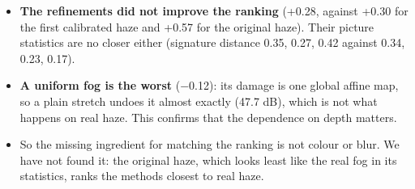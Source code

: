 \documentclass[10pt,a4paper]{article}
\begin{document}
\begin{itemize}
\item \textbf{The refinements did not improve the ranking} (+0.28, against +0.30 for the first calibrated haze and +0.57 for the original haze). Their picture statistics are no closer either (signature distance 0.35, 0.27, 0.42 against 0.34, 0.23, 0.17).
\item \textbf{A uniform fog is the worst} ($-$0.12): its damage is one global affine map, so a plain stretch undoes it almost exactly (47.7 dB), which is not what happens on real haze. This confirms that the dependence on depth matters.
\item So the missing ingredient for matching the ranking is not colour or blur. We have not found it: the original haze, which looks least like the real fog in its statistics, ranks the methods closest to real haze.
\end{itemize}
\end{document}
